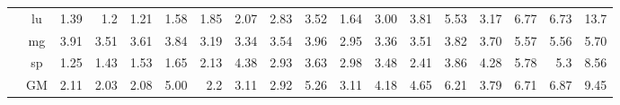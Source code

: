 \begin{table*}[]
\begin{center}
{\begin{tabular}{|c|c|rrrr|rrrr|rrrr|rrrr|}
 & lu &           1.39 &            1.2 &          1.21 &           1.58 &         1.85 &           2.07 &          2.83 &           3.52 &          1.64 &               3.00 &           3.81 &            5.53 &           3.17 &            6.77 &           6.73 &            13.7 \\
 & mg &           3.91 &           3.51 &          3.61 &           3.84 &         3.19 &           3.34 &          3.54 &           3.96 &          2.95 &            3.36 &           3.51 &            3.82 &            3.70 &            5.57 &           5.56 &             5.70 \\
 & sp &           1.25 &           1.43 &          1.53 &           1.65 &         2.13 &           4.38 &          2.93 &           3.63 &          2.98 &            3.48 &           2.41 &            3.86 &           4.28 &            5.78 &            5.3 &            8.56 \\ \cline{2-18}
 & GM &           2.11 &           2.03 &          2.08 &              5.00 &          2.2 &           3.11 &          2.92 &           5.26 &          3.11 &            4.18 &           4.65 &            6.21 &           3.79 &            6.71 &           6.87 &            9.45 \\
\hline
\end{tabular}
}
\end{center}
\end{table*}